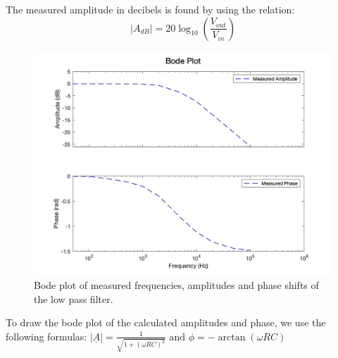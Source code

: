 The measured amplitude in decibels is found by using the relation:
\begin{equation}
    |A_{dB}| = 20\log_{10}\left(\frac{V_{out}}{V_{in}}\right)
\end{equation}


\begin{figure}[H]
    \centering
    \includegraphics[scale=0.3]{images/bode_plot_low_pass_measured.jpg}
    \caption{Bode plot of measured frequencies, amplitudes and phase shifts of the low pass filter.}
\end{figure}

To draw the bode plot of the calculated amplitudes and phase, we use the following formulas:
$|\underline{A}| = \frac{1}{\sqrt{1 + (\omega RC)^2}} \text{ and } \phi = -\arctan(\omega RC)$


